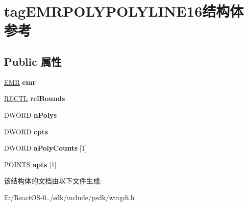 \hypertarget{structtag_e_m_r_p_o_l_y_p_o_l_y_l_i_n_e16}{}\section{tag\+E\+M\+R\+P\+O\+L\+Y\+P\+O\+L\+Y\+L\+I\+N\+E16结构体 参考}
\label{structtag_e_m_r_p_o_l_y_p_o_l_y_l_i_n_e16}
\subsection*{Public 属性}
\begin{DoxyCompactItemize}
\item 
\mbox{\label{structtag_e_m_r_p_o_l_y_p_o_l_y_l_i_n_e16_a42393d4e62c29bfc22e718d2f995c81c}} 
\hyperlink{structtag_e_m_r}{E\+MR} {\bfseries emr}
\item 
\mbox{\label{structtag_e_m_r_p_o_l_y_p_o_l_y_l_i_n_e16_a77b5fd8d5c6a2308b3c9200ec401bc0c}} 
\hyperlink{struct___r_e_c_t_l}{R\+E\+C\+TL} {\bfseries rcl\+Bounds}
\item 
\mbox{\label{structtag_e_m_r_p_o_l_y_p_o_l_y_l_i_n_e16_aa6301d67c642021131706a803d57a468}} 
D\+W\+O\+RD {\bfseries n\+Polys}
\item 
\mbox{\label{structtag_e_m_r_p_o_l_y_p_o_l_y_l_i_n_e16_af9da651a9e50a542efaaaf713720c84c}} 
D\+W\+O\+RD {\bfseries cpts}
\item 
\mbox{\label{structtag_e_m_r_p_o_l_y_p_o_l_y_l_i_n_e16_ae9ff5ca0071a192c0a04ad4f43185692}} 
D\+W\+O\+RD {\bfseries a\+Poly\+Counts} \mbox{[}1\mbox{]}
\item 
\mbox{\label{structtag_e_m_r_p_o_l_y_p_o_l_y_l_i_n_e16_aab1097526381d3fa85c9c9494dcef1d8}} 
\hyperlink{structtag_p_o_i_n_t_s}{P\+O\+I\+N\+TS} {\bfseries apts} \mbox{[}1\mbox{]}
\end{DoxyCompactItemize}


该结构体的文档由以下文件生成\+:\begin{DoxyCompactItemize}
\item 
E\+:/\+React\+O\+S-\/0../sdk/include/psdk/wingdi.\+h\end{DoxyCompactItemize}
